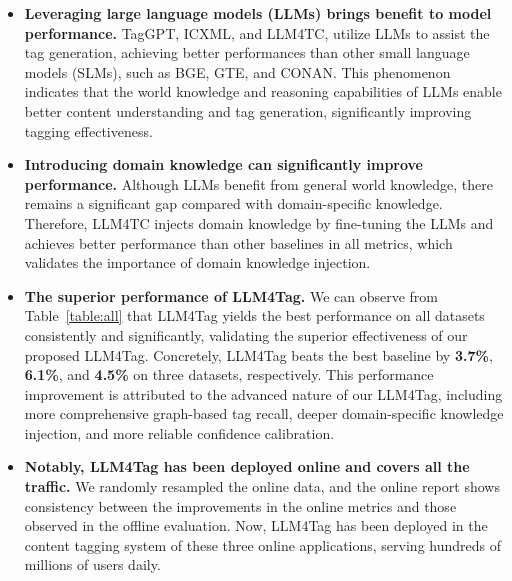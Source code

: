 \begin{itemize}[leftmargin = 12 pt]
    \item \textbf{Leveraging large language models (LLMs) brings benefit to model performance.} TagGPT, ICXML, and LLM4TC, utilize LLMs to assist the tag generation, achieving better performances than other small language models (SLMs), such as BGE, GTE, and CONAN.
    This phenomenon indicates that the world knowledge and reasoning capabilities of LLMs enable better content understanding and tag generation, significantly improving tagging effectiveness.
    
    
    \item \textbf{Introducing domain knowledge can significantly improve performance.} Although LLMs benefit from general world knowledge, there remains a significant gap compared with domain-specific knowledge. Therefore, LLM4TC injects domain knowledge by fine-tuning the LLMs and achieves better performance than other baselines in all metrics, which validates the importance of domain knowledge injection.
    \item \textbf{The superior performance of LLM4Tag.} We can observe from Table~\ref{table:all} that LLM4Tag yields the best performance on all datasets consistently and significantly, validating the superior effectiveness of our proposed LLM4Tag. Concretely, LLM4Tag beats the best baseline by \textbf{3.7\%}, \textbf{6.1\%}, and \textbf{4.5\%} on three datasets, respectively. This performance improvement is attributed to the advanced nature of our LLM4Tag, including more comprehensive graph-based tag recall, deeper domain-specific knowledge injection, and more reliable confidence calibration.
    \item \textbf{Notably, LLM4Tag has been deployed online and covers all the traffic.} We randomly resampled the online data, and the online report shows consistency between the improvements in the online metrics and those observed in the offline evaluation. Now, LLM4Tag has been deployed in the content tagging system of these three online applications, serving hundreds of millions of users daily.
    
    
\end{itemize}



